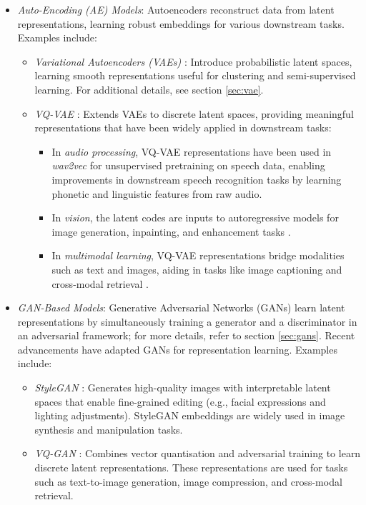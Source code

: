 \begin{itemize}
    \item \emph{Auto-Encoding (AE) Models}: Autoencoders reconstruct data from latent representations, learning robust embeddings for various downstream tasks. Examples include:
    \begin{itemize}
        \item \emph{Variational Autoencoders (VAEs)} \citep{kingma2013auto}: Introduce probabilistic latent spaces, learning smooth representations useful for clustering and semi-supervised learning. For additional details, see section \ref{sec:vae}.
        \item \emph{VQ-VAE} \citep{oord2017neural}: Extends VAEs to discrete latent spaces, providing meaningful representations that have been widely applied in downstream tasks:
        \begin{itemize}
            \item In \textit{audio processing}, VQ-VAE representations have been used in \textit{wav2vec} \citep{baevski2020wav2vec} for unsupervised pretraining on speech data, enabling improvements in downstream speech recognition tasks by learning phonetic and linguistic features from raw audio.
            \item In \textit{vision}, the latent codes are inputs to autoregressive models for image generation, inpainting, and enhancement tasks \citep{razavi2019generating}.
            \item In \textit{multimodal learning}, VQ-VAE representations bridge modalities such as text and images, aiding in tasks like image captioning and cross-modal retrieval \citep{ding2021vqvae}.
        \end{itemize}
    \end{itemize}
    \item \emph{GAN-Based Models}: Generative Adversarial Networks (GANs) learn latent representations by simultaneously training a generator and a discriminator in an adversarial framework; for more details, refer to section \ref{sec:gans}. Recent advancements have adapted GANs for representation learning. Examples include:
    \begin{itemize}
        \item \emph{StyleGAN} \citep{karras2019style}: Generates high-quality images with interpretable latent spaces that enable fine-grained editing (e.g., facial expressions and lighting adjustments). StyleGAN embeddings are widely used in image synthesis and manipulation tasks.
        \item \emph{VQ-GAN} \citep{esser2021taming}: Combines vector quantisation and adversarial training to learn discrete latent representations. These representations are used for tasks such as text-to-image generation, image compression, and cross-modal retrieval.
    \end{itemize}
\end{itemize}

